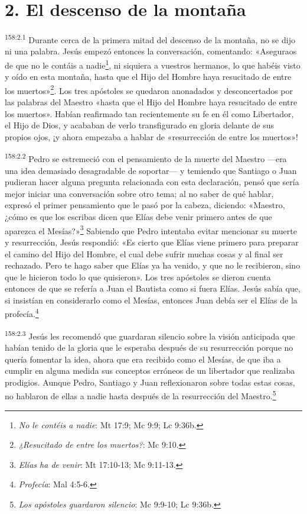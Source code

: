 \section*{2. El descenso de la montaña}
\par
\textsuperscript{158:2.1} Durante cerca de la primera mitad del descenso de la montaña, no se dijo ni una palabra. Jesús empezó entonces la conversación, comentando: «Aseguraos de que no le contáis a nadie\footnote{\textit{No le contéis a nadie}: Mt 17:9; Mc 9:9; Lc 9:36b.}, ni siquiera a vuestros hermanos, lo que habéis visto y oído en esta montaña, hasta que el Hijo del Hombre haya resucitado de entre los muertos»\footnote{\textit{¿Resucitado de entre los muertos?}: Mc 9:10.}. Los tres apóstoles se quedaron anonadados y desconcertados por las palabras del Maestro «hasta que el Hijo del Hombre haya resucitado de entre los muertos». Habían reafirmado tan recientemente su fe en él como Libertador, el Hijo de Dios, y acababan de verlo transfigurado en gloria delante de sus propios ojos, ¡y ahora empezaba a hablar de «resurrección de entre los muertos»!

\par
\textsuperscript{158:2.2} Pedro se estremeció con el pensamiento de la muerte del Maestro ---era una idea demasiado desagradable de soportar--- y temiendo que Santiago o Juan pudieran hacer alguna pregunta relacionada con esta declaración, pensó que sería mejor iniciar una conversación sobre otro tema; al no saber de qué hablar, expresó el primer pensamiento que le pasó por la cabeza, diciendo: «Maestro, ¿cómo es que los escribas dicen que Elías debe venir primero antes de que aparezca el Mesías?»\footnote{\textit{Elías ha de venir}: Mt 17:10-13; Mc 9:11-13.} Sabiendo que Pedro intentaba evitar mencionar su muerte y resurrección, Jesús respondió: «Es cierto que Elías viene primero para preparar el camino del Hijo del Hombre, el cual debe sufrir muchas cosas y al final ser rechazado. Pero te hago saber que Elías ya ha venido, y que no le recibieron, sino que le hicieron todo lo que quisieron». Los tres apóstoles se dieron cuenta entonces de que se refería a Juan el Bautista como si fuera Elías. Jesús sabía que, si insistían en considerarlo como el Mesías, entonces Juan debía ser el Elías de la profecía.\footnote{\textit{Profecía}: Mal 4:5-6.}

\par
\textsuperscript{158:2.3} Jesús les recomendó que guardaran silencio sobre la visión anticipada que habían tenido de la gloria que le esperaba después de su resurrección porque no quería fomentar la idea, ahora que era recibido como el Mesías, de que iba a cumplir en alguna medida sus conceptos erróneos de un libertador que realizaba prodigios. Aunque Pedro, Santiago y Juan reflexionaron sobre todas estas cosas, no hablaron de ellas a nadie hasta después de la resurrección del Maestro.\footnote{\textit{Los apóstoles guardaron silencio}: Mc 9:9-10; Lc 9:36b.}

